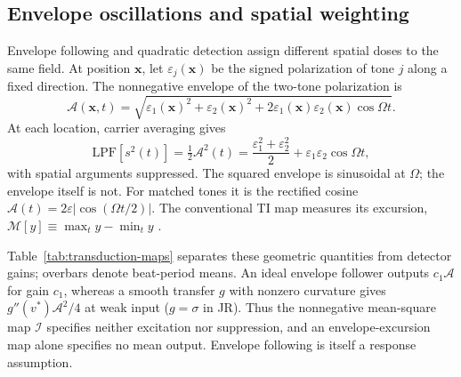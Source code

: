 \documentclass[11pt,a4paper]{article}
\newcommand{\Sig}{\sigma}
\begin{document}
\subsection{Envelope oscillations and spatial weighting}\label{sec:envelope}
Envelope following and quadratic detection assign different spatial doses
to the same field. At position $\mathbf x$, let $\varepsilon_j(\mathbf x)$ be
the signed polarization of tone $j$ along a fixed direction. The nonnegative
envelope of the two-tone polarization is
\[
\mathcal A(\mathbf x,t)=\sqrt{\varepsilon_1(\mathbf x)^2+\varepsilon_2(\mathbf x)^2
+2\varepsilon_1(\mathbf x)\varepsilon_2(\mathbf x)\cos\Omega t}.
\]
At each location, carrier averaging gives
\begin{equation}
\mathrm{LPF}[s^2(t)]=\tfrac12\mathcal A^2(t)
=\frac{\varepsilon_1^2+\varepsilon_2^2}{2}+\varepsilon_1\varepsilon_2\cos\Omega t,
\label{eq:sqenv}
\end{equation}
with spatial arguments suppressed. The squared envelope is sinusoidal at
$\Omega$; the envelope itself is not. For matched tones it is the rectified
cosine $\mathcal A(t)=2\varepsilon|\cos(\Omega t/2)|$.
The conventional TI map measures its excursion,
$\mathcal M[y]\equiv\max_t y-\min_t y$ \cite{grossman2017}.

Table~\ref{tab:transduction-maps} separates these geometric quantities from
detector gains; overbars denote beat-period means. An ideal envelope follower
outputs $c_1\mathcal A$ for gain $c_1$, whereas a smooth transfer $g$ with
nonzero curvature gives $g''(v^*)\mathcal A^2/4$ at weak input ($g=\Sig$ in JR).
Thus the nonnegative mean-square map $\mathcal I$ specifies neither excitation
nor suppression, and an envelope-excursion map alone specifies no mean output.
Envelope following is itself a response assumption.
\end{document}
